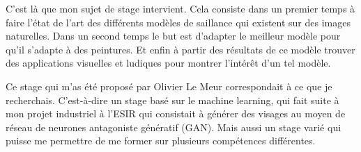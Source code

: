 \par
C'est là que mon sujet de stage intervient. Cela consiste dans un premier temps à faire l'état de l'art des différents modèles de saillance qui existent sur des images naturelles. Dans un second temps le but est d'adapter le meilleur modèle pour qu'il s'adapte à des peintures. Et enfin à partir des résultats de ce modèle trouver des applications visuelles et ludiques pour montrer l'intérêt d'un tel modèle.

\par 
Ce stage qui m'as été proposé par Olivier Le Meur correspondait à ce que je recherchais. C'est-à-dire un stage basé sur le machine learning, qui fait suite à mon projet industriel à l'ESIR qui consistait à générer des visages au moyen de réseau de neurones antagoniste génératif (GAN). Mais aussi un stage varié qui puisse me permettre de me former sur plusieurs compétences différentes.
